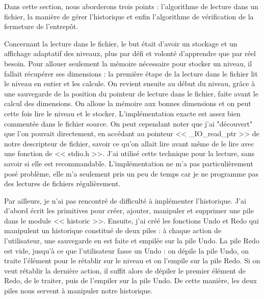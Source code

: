 \documentclass[11pt]{article}
\begin{document}
Dans cette section, nous aborderons trois points : l'algorithme de lecture dans
un fichier, la manière de gérer l'historique et enfin l'algorithme de
vérification de la fermeture de l'entrepôt.

Concernant la lecture dans le fichier, le but était d'avoir un stockage et un
affichage adaptatif des niveaux, plus par défi et volonté d'apprendre que par
réel besoin.  Pour allouer seulement la mémoire nécessaire pour stocker un
niveau, il fallait récupérer ses dimensions : la première étape de la lecture
dans le fichier lit le niveau en entier et les calcule. On revient ensuite au
début du niveau, grâce à une sauvegarde de la position du pointeur de lecture
dans le fichier, faite avant le calcul des dimensions. On alloue la mémoire aux
bonnes dimensions et on peut cette fois lire le niveau et le stocker.
L'implémentation exacte est assez bien commentée dans le fichier source.  On
peut cependant noter que j'ai "découvert" que l'on pouvait directement, en
accédant au pointeur << \_IO\_read\_ptr >> de notre descripteur de fichier,
savoir ce qu'on allait lire avant même de le lire avec une fonction de <<
stdio.h >>. J'ai utilisé cette technique pour la lecture, sans savoir si elle
est recommandable. L'implémentation ne m'a pas particulièrement posé problème,
elle m'a seulement pris un peu de temps car je ne programme pas des lectures de
fichiers régulièrement.

Par ailleurs, je n'ai pas rencontré de difficulté à implémenter l'historique.
J'ai d'abord écrit les primitives pour créer, ajouter, manipuler et supprimer
une pile dans le module << historic >>. Ensuite, j'ai créé les fonctions Undo et
Redo qui manipulent un historique constitué de deux piles : à chaque action de
l'utilisateur, une sauvegarde en est faite et empilée sur la pile Undo. La pile
Redo est vide, jusqu'à ce que l'utilisateur fasse un Undo : on dépile la pile
Undo, on traite l'élément pour le rétablir sur le niveau et on l'empile sur la
pile Redo. Si on veut rétablir la dernière action, il suffit alors de dépiler le
premier élément de Redo, de le traiter, puis de l'empiler sur la pile Undo. De
cette manière, les deux piles nous servent à manipuler notre historique.
\end{document}

